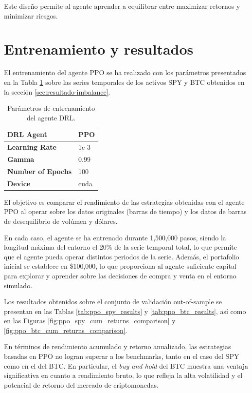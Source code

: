 \documentclass[a4paper,12pt, twoside]{report}
\begin{document}
Este diseño permite al agente aprender a equilibrar entre maximizar retornos y minimizar riesgos.

\section{Entrenamiento y resultados}

El entrenamiento del agente PPO se ha realizado con los parámetros presentados en la Tabla \ref{tab:ppo_training_params} 
sobre las series temporales de los activos SPY y BTC obtenidos en la sección \ref{sec:resultado-imbalance}. 

\begin{table}[h]
    \centering
    \begin{tabular}{|l|l|}
    \hline
    \textbf{DRL Agent}  & PPO    \\ \hline
    \textbf{Learning Rate} & 1e-3  \\ \hline
    \textbf{Gamma} & 0.99  \\ \hline
    \textbf{Number of Epochs} & 100 \\ \hline
    \textbf{Device} & cuda \\ \hline
    \end{tabular}
    \caption{Parámetros de entrenamiento del agente DRL.}
    \label{tab:ppo_training_params}
\end{table}

El objetivo es comparar el rendimiento de las estrategias obtenidas con el agente PPO al operar sobre
los datos originales (barras de tiempo) y los datos de barras de desequilibrio de volúmen y dólares.

En cada caso, el agente se ha entrenado durante 1,500,000 pasos, siendo la longitud máxima del entorno
el 20\% de la serie temporal total, lo que permite que el agente pueda operar distintos periodos de la
serie. Además, el portafolio inicial se establece en \$100,000, lo que 
proporciona al agente suficiente capital para explorar y aprender sobre las decisiones de compra 
y venta en el entorno simulado. 

Los resultados obtenidos sobre el conjunto de validación out-of-sample se presentan en las 
Tablas \ref{tab:ppo_spy_results} y \ref{tab:ppo_btc_results}, así como en las Figuras 
\ref{fig:ppo_spy_cum_returns_comparison} y \ref{fig:ppo_btc_cum_returns_comparison}.

En términos de rendimiento acumulado y retorno anualizado, las estrategias basadas en PPO no logran 
superar a los benchmarks, tanto en el caso del SPY como en el del BTC. En particular, el \textit{buy and hold} del 
BTC muestra una ventaja significativa en cuanto a rendimiento bruto, lo que refleja la alta volatilidad y 
el potencial de retorno del mercado de criptomonedas.
\end{document}
